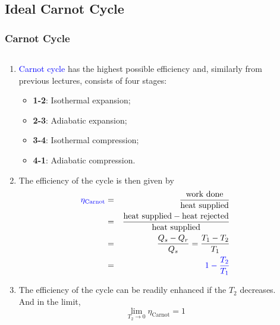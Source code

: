 \documentclass[10pt,compress]{beamer}
\newcommand{\frc}{\displaystyle\frac}
\newcommand{\blue}{\textcolor{blue}}
\begin{document}
\subsection{Ideal Carnot Cycle}
\begin{frame}
 \frametitle{Carnot Cycle}
 \begin{columns}
  \begin{column}[c]{0.45\linewidth}
   \begin{enumerate}[(1)] \scriptsize
     \item<1-> \blue{Carnot cycle} has the highest possible efficiency and, similarly from previous lectures, consists of four stages:
     \begin{itemize}\scriptsize
       \item<1-> {\bf 1-2}: Isothermal expansion; 
       \item<1-> {\bf 2-3}: Adiabatic expansion;
       \item<1-> {\bf 3-4}: Isothermal compression;
       \item<1-> {\bf 4-1}: Adiabatic compression.
     \end{itemize}\scriptsize
     \item <2-> The efficiency of the cycle is then given by
       \begin{eqnarray}
        \textcolor{blue}{\eta_{\text{Carnot}}} &=& \displaystyle\frac{\text{work done}}{\text{heat supplied}} \nonumber\\
                         &=& \displaystyle\frac{\text{heat supplied}-\text{heat rejected}}{\text{heat supplied}} \nonumber \\
                         &=& \displaystyle\frac{Q_{s}-Q_{r}}{Q_{s}} = \displaystyle\frac{T_{1}-T_{2}}{T_{1}} \nonumber  \\
                         &=&  \blue{1 - \frc{T_{2}}{T_{1}}}
       \end{eqnarray}
     \item<3-> The efficiency of the cycle can be readily enhanced if the $T_{2}$ decreases. And in the limit,
        \begin{displaymath}
           \lim_{T_{2} \to 0}\eta_{\text{Carnot}} = 1
        \end{displaymath}
   \end{enumerate}
  \end{column}
  \begin{column}[c]{0.55\linewidth}
   \begin{enumerate}[(1)]\setcounter{enumi}{3} \scriptsize

\end{enumerate}
\end{column}
\end{columns}
\end{frame}
\end{document}

